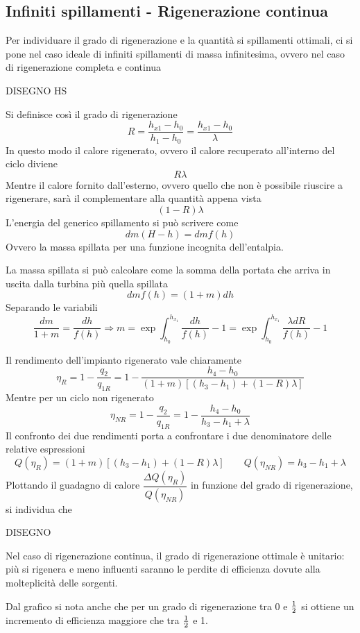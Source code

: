 \subsection{Infiniti spillamenti - Rigenerazione continua}
\begin{adjustwidth}{2in}{}
	Per individuare il grado di rigenerazione e la quantità si spillamenti ottimali, ci si pone nel caso ideale di infiniti spillamenti di massa infinitesima, ovvero nel caso di rigenerazione completa e continua
	
	DISEGNO HS
	
	Si definisce così il grado di rigenerazione 
	\[R = \dfrac{h_{x1}-h_0}{h_1-h_0} = \dfrac{h_{x1}-h_0}{\lambda}\]
	In questo modo il calore rigenerato, ovvero il calore recuperato all'interno del ciclo diviene 
	\[R\lambda\]
	Mentre il calore fornito dall'esterno, ovvero quello che non è possibile riuscire a rigenerare, sarà il complementare alla quantità appena vista  
	\[(1-R)\lambda\]
	L'energia del generico spillamento si può scrivere come 
	\[dm(H-h) = dmf(h)\]
	Ovvero la massa spillata per una funzione incognita dell'entalpia. 
	
	La massa spillata si può calcolare come la somma della portata che arriva in uscita dalla turbina più quella spillata
	\[dmf(h) = (1+m)dh\]
	Separando le variabili
	\[\dfrac{dm}{1+m} = \dfrac{dh}{f(h)} \Rightarrow m = \exp{\int_{h_0}^{h_{x_1}}\dfrac{dh}{f(h)}}-1 = \exp{\int_{h_0}^{h_{x_1}}\dfrac{\lambda dR}{f(h)}}-1\]
	
	Il rendimento dell'impianto rigenerato vale chiaramente 
	\[\eta_R = 1- \dfrac{q_2}{q_{1R}} = 1 - \dfrac{h_4-h_0}{(1+m)[(h_3-h_1) + (1-R)\lambda]}\]
	Mentre per un ciclo non rigenerato 
	\[\eta_{NR} = 1- \dfrac{q_2}{q_{1R}} = 1 - \dfrac{h_4-h_0}{h_3-h_1 + \lambda} \]
	Il confronto dei due rendimenti porta a confrontare i due denominatore delle relative espressioni
	\[Q(\eta_R) = (1+m)[(h_3-h_1) + (1-R)\lambda] \qquad Q(\eta_{NR}) = h_3-h_1 + \lambda\]
	Plottando il guadagno di calore \(\dfrac{\Delta Q(\eta_R)}{Q(\eta_{NR})}\) in funzione del grado di rigenerazione, si individua che
	
	DISEGNO
	
	Nel caso di rigenerazione continua, il grado di rigenerazione ottimale è unitario: più si rigenera e meno influenti saranno le perdite di efficienza dovute alla molteplicità delle sorgenti.
	
	Dal grafico si nota anche che per un grado di rigenerazione tra 0 e ${1\over2}$ si ottiene un incremento di efficienza maggiore che tra ${1\over2}$ e 1.
\end{adjustwidth} 

